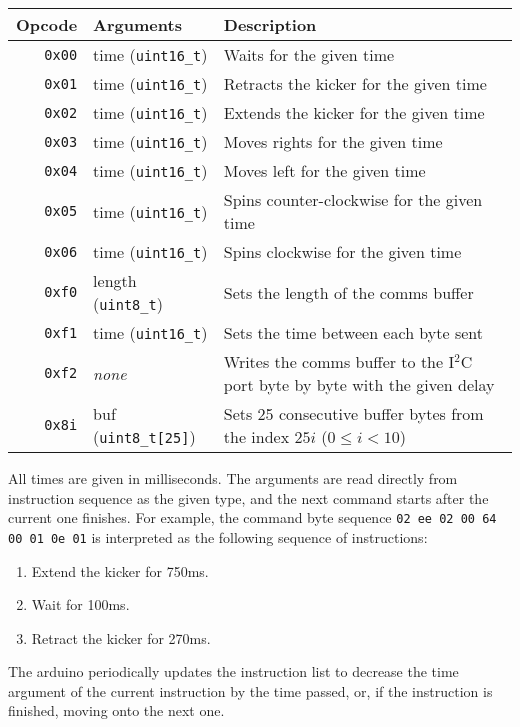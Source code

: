 \documentclass[a4paper]{scrartcl}
\begin{document}
\begin{tabularx}{\textwidth}{rlX}
    Opcode & Arguments & Description \\
    \hline
    \texttt{0x00} & time (\verb$uint16_t$) & Waits for
        the given time \\
    \texttt{0x01} & time (\verb$uint16_t$) &
        Retracts the kicker for the given time \\
    \texttt{0x02} & time (\verb$uint16_t$) &
        Extends the kicker for the given time \\
    \texttt{0x03} & time (\verb$uint16_t$) &
        Moves rights for the given time \\
    \texttt{0x04} & time (\verb$uint16_t$) &
        Moves left for the given time \\
    \texttt{0x05} & time (\verb$uint16_t$) &
        Spins counter-clockwise for the given time \\
    \texttt{0x06} & time (\verb$uint16_t$) &
        Spins clockwise for the given time \\
    \texttt{0xf0} & length (\verb$uint8_t$) &
        Sets the length of the comms buffer \\
    \texttt{0xf1} & time (\verb$uint16_t$) &
        Sets the time between each byte sent \\
    \texttt{0xf2} & \textit{none} &
        Writes the comms buffer to the I$^2$C port byte by byte with the given
        delay \\
    \texttt{0x8i} & buf (\verb$uint8_t[25]$) &
        Sets 25 consecutive buffer bytes from the index $25i$ ($0 \le i < 10$)
        \\
\end{tabularx}

All times are given in milliseconds. The arguments are read directly from
instruction sequence as the given type, and the next command starts after the
current one finishes. For example, the command byte sequence \texttt{02 ee 02
00 64 00 01 0e 01} is interpreted as the following sequence of instructions:

\begin{enumerate}
\item Extend the kicker for 750ms.
\item Wait for 100ms.
\item Retract the kicker for 270ms.
\end{enumerate}

The arduino periodically updates the instruction list to decrease the time
argument of the current instruction by the time passed, or, if the instruction
is finished, moving onto the next one.
\end{document}
